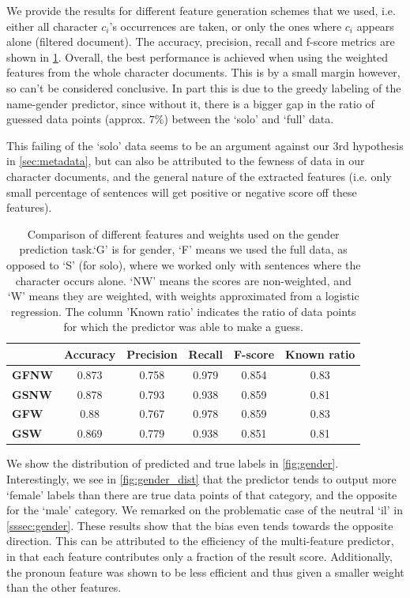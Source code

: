 We provide the results for different feature generation schemes that we used, i.e. either all character $c_i$'s occurrences are taken, or only the ones where $c_i$ appears alone (filtered document). The accuracy, precision, recall and f-score metrics are shown in \cref{tab:gender_metrics}. Overall, the best performance is achieved when using the weighted features from the whole character documents. This is by a small margin however, so can't be considered conclusive. In part this is due to the greedy labeling of the name-gender predictor, since without it, there is a bigger gap in the ratio of guessed data points (approx. $7\%$) between the `solo' and `full' data. 

This failing of the `solo' data seems to be an argument against our 3rd hypothesis in \cref{sec:metadata}, but can also be attributed to the fewness of data in our character documents, and the general nature of the extracted features (i.e. only small percentage of sentences will get positive or negative score off these features).

\begin{table}
\centering
\begin{tabular}{| >{\bf}l || *{5}{c|}}
\hline
					& Accuracy & Precision	& Recall & F-score & Known ratio	\\ \hline \hline
GFNW	& 0.873 & 0.758 & 0.979	& 0.854	& 0.83 	\\ \hline
GSNW	& 0.878	& 0.793	& 0.938	& 0.859	& 0.81	\\ \hline
GFW		& 0.88	& 0.767	& 0.978	& 0.859	& 0.83 \\ \hline
GSW		& 0.869	& 0.779 & 0.938 & 0.851	& 0.81 \\ \hline

\end{tabular}
\caption{Comparison of different features and weights used on the gender prediction task.`G' is for gender, `F' means we used the full data, as opposed to `S' (for solo), where we worked only with sentences where the character occurs alone. `NW' means the scores are non-weighted, and `W' means they are weighted, with weights approximated from a logistic regression. The column 'Known ratio' indicates the ratio of data points for which the predictor was able to make a guess.}
\label{tab:gender_metrics}
\end{table}

We show the distribution of predicted and true labels in \cref{fig:gender}.
Interestingly, we see in \cref{fig:gender_dist} that the predictor tends to output more `female' labels than there are true data points of that category, and the opposite for the `male' category. We remarked on the problematic case of the neutral `il' in \cref{sssec:gender}. These results show that the bias even tends towards the opposite direction. This can be attributed to the efficiency of the multi-feature predictor, in that each feature contributes only a fraction of the result score. Additionally, the pronoun feature was shown to be less efficient and thus given a smaller weight than the other features. 

